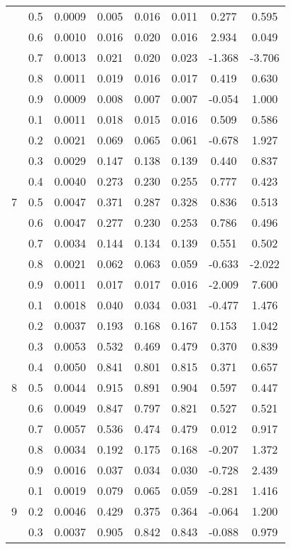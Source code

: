 \documentclass[11pt,a4paper]{report}
\begin{document}
\begin{longtable}{ | c | c || c | c | c | c | c | c | }
 & 0.5 & 0.0009 & 0.005 & 0.016 & 0.011 & 0.277 & 0.595 \\
 & 0.6 & 0.0010 & 0.016 & 0.020 & 0.016 & 2.934 & 0.049 \\
 & 0.7 & 0.0013 & 0.021 & 0.020 & 0.023 & -1.368 & -3.706 \\
 & 0.8 & 0.0011 & 0.019 & 0.016 & 0.017 & 0.419 & 0.630 \\
 & 0.9 & 0.0009 & 0.008 & 0.007 & 0.007 & -0.054 & 1.000 \\
 \hline
\multirow{9}{*}{7} & 0.1 & 0.0011 & 0.018 & 0.015 & 0.016 & 0.509 & 0.586 \\
 & 0.2 & 0.0021 & 0.069 & 0.065 & 0.061 & -0.678 & 1.927 \\
 & 0.3 & 0.0029 & 0.147 & 0.138 & 0.139 & 0.440 & 0.837 \\
 & 0.4 & 0.0040 & 0.273 & 0.230 & 0.255 & 0.777 & 0.423 \\
 & 0.5 & 0.0047 & 0.371 & 0.287 & 0.328 & 0.836 & 0.513 \\
 & 0.6 & 0.0047 & 0.277 & 0.230 & 0.253 & 0.786 & 0.496 \\
 & 0.7 & 0.0034 & 0.144 & 0.134 & 0.139 & 0.551 & 0.502 \\
 & 0.8 & 0.0021 & 0.062 & 0.063 & 0.059 & -0.633 & -2.022 \\
 & 0.9 & 0.0011 & 0.017 & 0.017 & 0.016 & -2.009 & 7.600 \\
 \hline
\multirow{9}{*}{8} & 0.1 & 0.0018 & 0.040 & 0.034 & 0.031 & -0.477 & 1.476 \\
 & 0.2 & 0.0037 & 0.193 & 0.168 & 0.167 & 0.153 & 1.042 \\
 & 0.3 & 0.0053 & 0.532 & 0.469 & 0.479 & 0.370 & 0.839 \\
 & 0.4 & 0.0050 & 0.841 & 0.801 & 0.815 & 0.371 & 0.657 \\
 & 0.5 & 0.0044 & 0.915 & 0.891 & 0.904 & 0.597 & 0.447 \\
 & 0.6 & 0.0049 & 0.847 & 0.797 & 0.821 & 0.527 & 0.521 \\
 & 0.7 & 0.0057 & 0.536 & 0.474 & 0.479 & 0.012 & 0.917 \\
 & 0.8 & 0.0034 & 0.192 & 0.175 & 0.168 & -0.207 & 1.372 \\
 & 0.9 & 0.0016 & 0.037 & 0.034 & 0.030 & -0.728 & 2.439 \\
 \hline
\multirow{9}{*}{9} & 0.1 & 0.0019 & 0.079 & 0.065 & 0.059 & -0.281 & 1.416 \\
 & 0.2 & 0.0046 & 0.429 & 0.375 & 0.364 & -0.064 & 1.200 \\
 & 0.3 & 0.0037 & 0.905 & 0.842 & 0.843 & -0.088 & 0.979 \\

\end{longtable}
\end{document}
